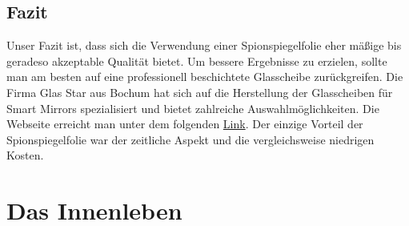 \subsection{Fazit}
Unser Fazit ist, dass sich die Verwendung einer Spionspiegelfolie eher mäßige bis geradeso akzeptable Qualität bietet. Um bessere Ergebnisse zu erzielen, sollte man am besten auf eine professionell beschichtete Glasscheibe zurückgreifen. Die Firma Glas Star aus Bochum hat sich auf die Herstellung der Glasscheiben für Smart Mirrors spezialisiert und bietet zahlreiche Auswahlmöglichkeiten. Die Webseite erreicht man unter dem folgenden \href{https://www.glas-star.de/spionspiegelnachmass/chrome-spy-spiegel/}{Link}. Der einzige Vorteil der Spionspiegelfolie war der zeitliche Aspekt und die vergleichsweise niedrigen Kosten.

\section{Das Innenleben}
